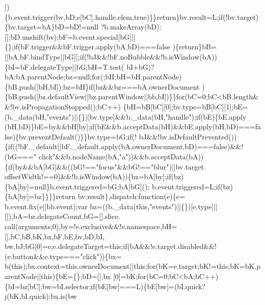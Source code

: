 \begin{DoxyCode}
      ])\{b.event.trigger(bv,bD,e[bC].handle.elem,\textcolor{keyword}{true})\}\}\textcolor{keywordflow}{return}\}bv.result=L;\textcolor{keywordflow}{if}(!bv.target)\{bv.target=bA\}bD=bD!=null
      ?b.makeArray(bD):[];bD.unshift(bv);bF=b.event.special[bG]||\{\};\textcolor{keywordflow}{if}(bF.trigger&&bF.trigger.apply(bA,bD)===\textcolor{keyword}{false}
      )\{\textcolor{keywordflow}{return}\}bB=[[bA,bF.bindType||bG]];\textcolor{keywordflow}{if}(!bJ&&!bF.noBubble&&!b.isWindow(bA))\{bI=bF.delegateType||bG;bH=T.test(
      bI+bG)?bA:bA.parentNode;bz=null;\textcolor{keywordflow}{for}(;bH;bH=bH.parentNode)\{bB.push([bH,bI]);bz=bH\}\textcolor{keywordflow}{if}(bz&&bz===bA.ownerDocument
      )\{bB.push([bz.defaultView||bz.parentWindow||bb,bI])\}\}\textcolor{keywordflow}{for}(bC=0;bC<bB.length&&!bv.isPropagationStopped();bC++)
      \{bH=bB[bC][0];bv.type=bB[bC][1];bE=(b.\_data(bH,\textcolor{stringliteral}{"events"})||\{\})[bv.type]&&b.\_data(bH,\textcolor{stringliteral}{"handle"});\textcolor{keywordflow}{if}(bE)\{bE.apply
      (bH,bD)\}bE=by&&bH[by];\textcolor{keywordflow}{if}(bE&&b.acceptData(bH)&&bE.apply(bH,bD)===\textcolor{keyword}{false})\{bv.preventDefault()\}\}bv.type=bG;\textcolor{keywordflow}{if}(!
      bJ&&!bv.isDefaultPrevented())\{\textcolor{keywordflow}{if}((!bF.\_default||bF.\_default.apply(bA.ownerDocument,bD)===\textcolor{keyword}{false})&&!(bG===\textcolor{stringliteral}{"
      click"}&&b.nodeName(bA,\textcolor{stringliteral}{"a"}))&&b.acceptData(bA))\{\textcolor{keywordflow}{if}(by&&bA[bG]&&((bG!==\textcolor{stringliteral}{"focus"}&&bG!==\textcolor{stringliteral}{"blur"})||bv.target.
      offsetWidth!==0)&&!b.isWindow(bA))\{bz=bA[by];\textcolor{keywordflow}{if}(bz)\{bA[by]=null\}b.event.triggered=bG;bA[bG]();
      b.event.triggered=L;\textcolor{keywordflow}{if}(bz)\{bA[by]=bz\}\}\}\}\textcolor{keywordflow}{return} bv.result\},dispatch:\textcolor{keyword}{function}(e)\{e=
      b.event.fix(e||bb.event);var bz=((b.\_data(\textcolor{keyword}{this},\textcolor{stringliteral}{"events"})||\{\})[e.type]||[]),bA=bz.delegateCount,bG=[].slice.
      call(arguments,0),by=!e.exclusive&&!e.namespace,bH=[],bC,bB,bK,bx,bF,bE,bv,bD,bI,
      bw,bJ;bG[0]=e;e.delegateTarget=\textcolor{keyword}{this};\textcolor{keywordflow}{if}(bA&&!e.target.disabled&&!(e.button&&e.type===\textcolor{stringliteral}{"click"}))\{bx=
      b(\textcolor{keyword}{this});bx.context=this.ownerDocument||\textcolor{keyword}{this};\textcolor{keywordflow}{for}(bK=e.target;bK!=\textcolor{keyword}{this};bK=bK.parentNode||\textcolor{keyword}{this})\{bE=\{\};bD=[];bx
      [0]=bK;\textcolor{keywordflow}{for}(bC=0;bC<bA;bC++)\{bI=bz[bC];bw=bI.selector;\textcolor{keywordflow}{if}(bE[bw]===L)\{bE[bw]=(bI.quick?j(bK,bI.quick):bx.is(bw

\end{DoxyCode}
